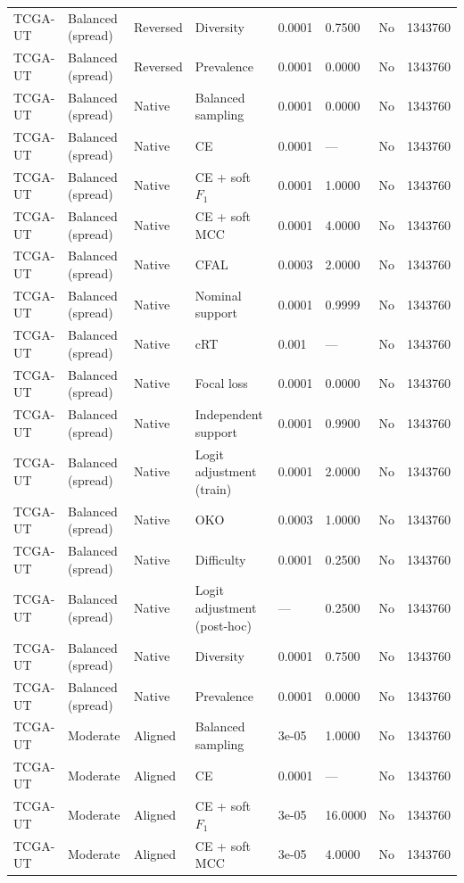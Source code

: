 \begin{longtable}{lllllllr}
TCGA-UT & Balanced (spread) & Reversed & Diversity & 0.0001 & 0.7500 & No & 1343760 \\
TCGA-UT & Balanced (spread) & Reversed & Prevalence & 0.0001 & 0.0000 & No & 1343760 \\
TCGA-UT & Balanced (spread) & Native & Balanced sampling & 0.0001 & 0.0000 & No & 1343760 \\
TCGA-UT & Balanced (spread) & Native & CE & 0.0001 & --- & No & 1343760 \\
TCGA-UT & Balanced (spread) & Native & CE + soft $F_1$ & 0.0001 & 1.0000 & No & 1343760 \\
TCGA-UT & Balanced (spread) & Native & CE + soft MCC & 0.0001 & 4.0000 & No & 1343760 \\
TCGA-UT & Balanced (spread) & Native & CFAL & 0.0003 & 2.0000 & No & 1343760 \\
TCGA-UT & Balanced (spread) & Native & Nominal support & 0.0001 & 0.9999 & No & 1343760 \\
TCGA-UT & Balanced (spread) & Native & cRT & 0.001 & --- & No & 1343760 \\
TCGA-UT & Balanced (spread) & Native & Focal loss & 0.0001 & 0.0000 & No & 1343760 \\
TCGA-UT & Balanced (spread) & Native & Independent support & 0.0001 & 0.9900 & No & 1343760 \\
TCGA-UT & Balanced (spread) & Native & Logit adjustment (train) & 0.0001 & 2.0000 & No & 1343760 \\
TCGA-UT & Balanced (spread) & Native & OKO & 0.0003 & 1.0000 & No & 1343760 \\
TCGA-UT & Balanced (spread) & Native & Difficulty & 0.0001 & 0.2500 & No & 1343760 \\
TCGA-UT & Balanced (spread) & Native & Logit adjustment (post-hoc) & --- & 0.2500 & No & 1343760 \\
TCGA-UT & Balanced (spread) & Native & Diversity & 0.0001 & 0.7500 & No & 1343760 \\
TCGA-UT & Balanced (spread) & Native & Prevalence & 0.0001 & 0.0000 & No & 1343760 \\
TCGA-UT & Moderate & Aligned & Balanced sampling & 3e-05 & 1.0000 & No & 1343760 \\
TCGA-UT & Moderate & Aligned & CE & 0.0001 & --- & No & 1343760 \\
TCGA-UT & Moderate & Aligned & CE + soft $F_1$ & 3e-05 & 16.0000 & No & 1343760 \\
TCGA-UT & Moderate & Aligned & CE + soft MCC & 3e-05 & 4.0000 & No & 1343760 \\

\end{longtable}
